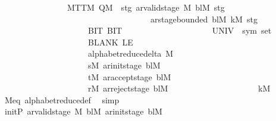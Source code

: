 \begin{isabellebody}
\ \ \ \ \ \ \ \ \ \ \ \ \ \ \ \ MTTM\ {\isacharparenleft}{\kern0pt}Q\isactrlsub M\ {\isasymtimes}\ {\isacharbraceleft}{\kern0pt}stg{\isachardot}{\kern0pt}\ ar{\isacharunderscore}{\kern0pt}valid{\isacharunderscore}{\kern0pt}stage\ {\isasymGamma}\isactrlsub M\ bl\isactrlsub M\ stg\isanewline
\ \ \ \ \ \ \ \ \ \ \ \ \ \ \ \ \ \ \ \ \ \ \ \ \ \ \ \ \ \ \ \ \ \ \ {\isasymand}\ ar{\isacharunderscore}{\kern0pt}stage{\isacharunderscore}{\kern0pt}bounded\ bl\isactrlsub M\ k\isactrlsub M\ stg{\isacharbraceright}{\kern0pt}{\isacharparenright}{\kern0pt}\isanewline
\ \ \ \ \ \ \ \ \ \ \ \ \ \ \ \ \ \ \ \ \ {\isacharbraceleft}{\kern0pt}BIT{}{\isacharcomma}{\kern0pt}\ BIT{}{\isacharbraceright}{\kern0pt}\isanewline
\ \ \ \ \ \ \ \ \ \ \ \ \ \ \ \ \ \ \ \ \ {\isacharparenleft}{\kern0pt}UNIV\ {\isacharcolon}{\kern0pt}{\isacharcolon}{\kern0pt}\ sym{}\ set{\isacharparenright}{\kern0pt}\isanewline
\ \ \ \ \ \ \ \ \ \ \ \ \ \ \ \ \ \ \ \ \ BLANK{}\ LE{}\isanewline
\ \ \ \ \ \ \ \ \ \ \ \ \ \ \ \ \ \ \ \ \ {\isacharparenleft}{\kern0pt}alphabet{\isacharunderscore}{\kern0pt}reduce{\isacharunderscore}{\kern0pt}delta\ M{\isacharparenright}{\kern0pt}\isanewline
\ \ \ \ \ \ \ \ \ \ \ \ \ \ \ \ \ \ \ \ \ {\isacharparenleft}{\kern0pt}s\isactrlsub M{\isacharcomma}{\kern0pt}\ ar{\isacharunderscore}{\kern0pt}init{\isacharunderscore}{\kern0pt}stage\ bl\isactrlsub M{\isacharparenright}{\kern0pt}\isanewline
\ \ \ \ \ \ \ \ \ \ \ \ \ \ \ \ \ \ \ \ \ {\isacharparenleft}{\kern0pt}t\isactrlsub M{\isacharcomma}{\kern0pt}\ ar{\isacharunderscore}{\kern0pt}accept{\isacharunderscore}{\kern0pt}stage\ bl\isactrlsub M{\isacharparenright}{\kern0pt}\isanewline
\ \ \ \ \ \ \ \ \ \ \ \ \ \ \ \ \ \ \ \ \ {\isacharparenleft}{\kern0pt}r\isactrlsub M{\isacharcomma}{\kern0pt}\ ar{\isacharunderscore}{\kern0pt}reject{\isacharunderscore}{\kern0pt}stage\ bl\isactrlsub M{\isacharparenright}{\kern0pt}\isanewline
\ \ \ \ \ \ \ \ \ \ \ \ \ \ \ \ \ \ \ \ \ k\isactrlsub M{\isachardoublequoteclose}\isanewline
\ \ \ \ \isamarkupfalse%
\ M{\isacharunderscore}{\kern0pt}eq\ alphabet{\isacharunderscore}{\kern0pt}reduce{\isacharunderscore}{\kern0pt}def\ \isamarkupfalse%
\ simp\isanewline
\isanewline
\ \ %
\isanewline
\ \ \isamarkupfalse%
\ init{\isacharunderscore}{\kern0pt}P{\isacharcolon}{\kern0pt}\ {\isachardoublequoteopen}ar{\isacharunderscore}{\kern0pt}valid{\isacharunderscore}{\kern0pt}stage\ {\isasymGamma}\isactrlsub M\ bl\isactrlsub M\ {\isacharparenleft}{\kern0pt}ar{\isacharunderscore}{\kern0pt}init{\isacharunderscore}{\kern0pt}stage\ bl\isactrlsub M{\isacharparenright}{\kern0pt}\isanewline

\end{isabellebody}
